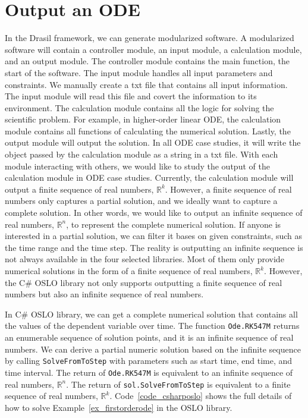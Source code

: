 \section{Output an ODE}
In the Drasil framework, we can generate modularized software. A modularized software will contain a controller module, an input module, a calculation module, and an output module. The controller module contains the main function, the start of the software. The input module handles all input parameters and constraints. We manually create a txt file that contains all input information. The input module will read this file and covert the information to its environment. The calculation module contains all the logic for solving the scientific problem. For example, in higher-order linear ODE, the calculation module contains all functions of calculating the numerical solution. Lastly, the output module will output the solution. In all ODE case studies, it will write the object passed by the calculation module as a string in a txt file. With each module interacting with others, we would like to study the output of the calculation module in ODE case studies. Currently, the calculation module will output a finite sequence of real numbers, $\mathbb{R}^k$. However, a finite sequence of real numbers only captures a partial solution, and we ideally want to capture a complete solution. In other words, we would like to output an infinite sequence of real numbers, $\mathbb{R}^n$, to represent the complete numerical solution. If anyone is interested in a partial solution, we can filter it bases on given constraints, such as the time range and the time step. The reality is outputting an infinite sequence is not always available in the four selected libraries. Most of them only provide numerical solutions in the form of a finite sequence of real numbers, $\mathbb{R}^k$. However, the C\# OSLO library not only supports outputting a finite sequence of real numbers but also an infinite sequence of real numbers. 

In C\# OSLO library, we can get a complete numerical solution that contains all the values of the dependent variable over time. The function \verb|Ode.RK547M| returns an enumerable sequence of solution points, and it is an infinite sequence of real numbers. We can derive a partial numeric solution based on the infinite sequence by calling \verb|SolveFromToStep| with parameters such as start time, end time, and time interval. The return of \verb|Ode.RK547M| is equivalent to an infinite sequence of real numbers, $\mathbb{R}^n$. The return of \verb|sol.SolveFromToStep| is equivalent to a finite sequence of real numbers, $\mathbb{R}^k$. Code~\ref{code_csharposlo} shows the full details of how to solve Example~\ref{ex_firstorderode} in the OSLO library.

